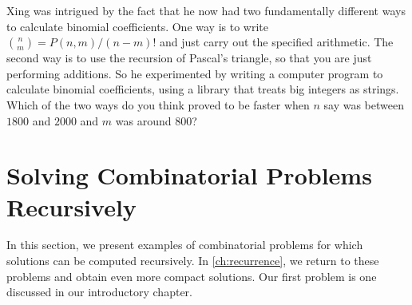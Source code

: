 Xing was intrigued by the fact that he now had two fundamentally
different ways to calculate binomial coefficients.  One way
is to write $\binom{n}{m}=P(n,m)/(n-m)!$ and just carry out
the specified arithmetic.  The second way is to use the
recursion of Pascal's triangle, so that you are just performing
additions.  So he experimented by writing a computer program
to calculate binomial coefficients, using a library that treats
big integers as strings.   Which of the two ways do you think
proved to be faster when $n$ say was between $1800$ and $2000$
and $m$ was around $800$?

\section{Solving Combinatorial Problems Recursively}\label{s:induction:recursion}

In this section, we present examples of combinatorial problems for
which solutions can be computed recursively.  In
\autoref{ch:recurrence}, we return to these problems and obtain even
more compact solutions.  Our first problem is one discussed in our
introductory chapter.

